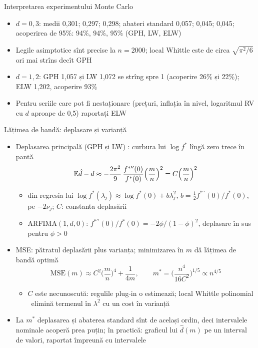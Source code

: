 \begin{frame}{Interpretarea experimentului Monte Carlo}
\itemsize{\small}
\begin{itemize}
    \item $d = 0{,}3$: medii 0{,}301; 0{,}297; 0{,}298; abateri standard 0{,}057; 0{,}045; 0{,}045; acoperirea de 95\%: 94\%, 94\%, 95\% (GPH, LW, ELW)
    \item Legile asimptotice sînt precise la $n = 2000$; local Whittle este de circa $\sqrt{\pi^2/6}$ ori mai strîns decît GPH
    \item $d = 1{,}2$: GPH 1{,}057 și LW 1{,}072 se strîng spre 1 (acoperire 26\% și 22\%); ELW 1{,}202, acoperire 93\%
    \item Pentru seriile care pot fi nestaționare (prețuri, inflația în nivel, logaritmul RV cu $d$ aproape de 0,5) raportați ELW
\end{itemize}
\end{frame}

\begin{frame}{Lățimea de bandă: deplasare și varianță}
\itemsize{\small}
\begin{itemize}
    \item Deplasarea principală (GPH și LW) : curbura lui $\log f^*$ lîngă zero trece în pantă
    \[ \mathbb{E}\hat d - d \approx -\frac{2\pi^2}{9}\,\frac{f^{*\prime\prime}(0)}{f^*(0)}\Big(\frac mn\Big)^2 = C\Big(\frac mn\Big)^2 \]
    \begin{itemize}
        \item din regresia lui $\log f^*(\lambda_j) \approx \log f^*(0) + b\lambda_j^2$, $b = \tfrac12f^{*\prime\prime}(0)/f^*(0)$, pe $-2\nu_j$; $C$: constanta deplasării
        \item ARFIMA$(1,d,0)$: $f^{*\prime\prime}(0)/f^*(0) = -2\phi/(1 - \phi)^2$, deplasare în sus pentru $\phi > 0$
    \end{itemize}
    \item MSE: pătratul deplasării plus varianța; minimizarea în $m$ dă lățimea de bandă optimă 
    \[ \mathrm{MSE}(m) \approx C^2\Big(\frac mn\Big)^4 + \frac{1}{4m}, \qquad m^* = \Big(\frac{n^4}{16C^2}\Big)^{1/5} \propto n^{4/5} \]
    \begin{itemize}
        \item $C$ este necunoscută: regulile plug-in o estimează; local Whittle polinomial \ elimină termenul în $\lambda^2$ cu un cost în varianță
    \end{itemize}
    \item La $m^*$ deplasarea și abaterea standard sînt de același ordin, deci intervalele nominale acoperă prea puțin; în practică: graficul lui $\hat d(m)$ pe un interval de valori, raportat împreună cu intervalele
\end{itemize}
\end{frame}

